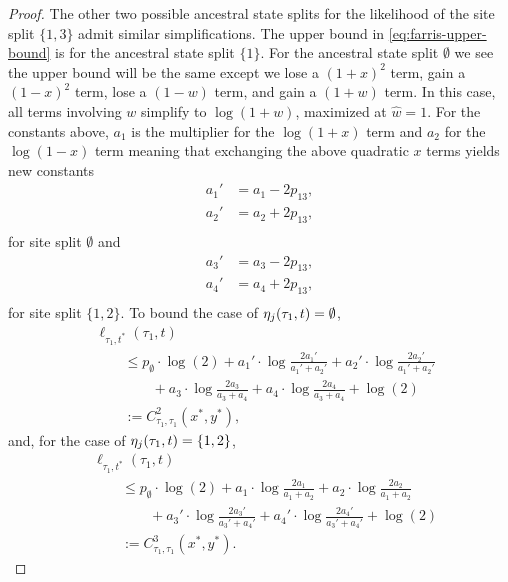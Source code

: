\begin{proof}
The other two possible ancestral state splits for the likelihood of the site split $\{1,3\}$ admit similar simplifications.
The upper bound in \eqref{eq:farris-upper-bound} is for the ancestral state split $\{1\}$.
For the ancestral state split $\emptyset$ we see the upper bound will be the same except we lose a $(1+x)^2$ term, gain a $(1-x)^2$ term, lose a $(1-w)$ term, and gain a $(1+w)$ term.
In this case, all terms involving $w$ simplify to $\log(1+w)$, maximized at $\hat{w}=1$.
For the constants above, $a_{1}$ is the multiplier for the $\log(1+x)$ term and $a_{2}$ for the $\log(1-x)$ term meaning that exchanging the above quadratic $x$ terms yields new constants
\begin{equation}
    \begin{aligned}
        a_{1}' &= a_{1}-2p_{13}, \\
        a_{2}' &= a_{2}+2p_{13}, \\
    \end{aligned}
    \label{eq:a_const_prime_x}
\end{equation}
for site split $\emptyset$ and
\begin{equation}
    \begin{aligned}
        a_{3}' &= a_{3}-2p_{13}, \\
        a_{4}' &= a_{4}+2p_{13}, \\
    \end{aligned}
    \label{eq:a_const_prime_y}
\end{equation}
for site split $\{1,2\}$.
To bound the case of $\eta_j(\tau_1, t) = \emptyset$,
\begin{align*}
&    \ell_{\tau_1,t^*}(\tau_1, t) \\
&\qquad\le      p_{\emptyset}  \cdot\log(2)
+ a_{1}'\cdot\log\frac{2a_{1}'}{a_{1}'+a_{2}'}
+ a_{2}'\cdot\log\frac{2a_{2}'}{a_{1}'+a_{2}'} \\
&\qquad\qquad + a_{3}\cdot\log\frac{2a_{3}}{a_{3}+a_{4}}
+ a_{4}\cdot\log\frac{2a_{4}}{a_{3}+a_{4}}
+ \log(2) \\
&\qquad := C^{2}_{\tau_1,\tau_1}(x^*, y^*),
\end{align*}
and, for the case of $\eta_j(\tau_1, t) = \{1,2\}$,
\begin{align*}
&    \ell_{\tau_1,t^*}(\tau_1, t) \\
&\qquad\le      p_{\emptyset}  \cdot\log(2)
+ a_{1}\cdot\log\frac{2a_{1}}{a_{1}+a_{2}}
+ a_{2}\cdot\log\frac{2a_{2}}{a_{1}+a_{2}} \\
&\qquad\qquad+ a_{3}'\cdot\log\frac{2a_{3}'}{a_{3}'+a_{4}'}
+ a_{4}'\cdot\log\frac{2a_{4}'}{a_{3}'+a_{4}'}
+ \log(2) \\
&\qquad := C^{3}_{\tau_1,\tau_1}(x^*, y^*).
\end{align*}


\end{proof}
